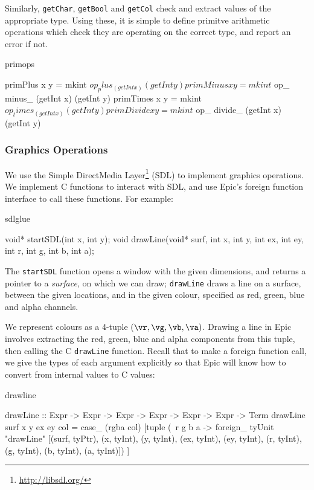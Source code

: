 \noindent
Similarly, \texttt{getChar}, \texttt{getBool} and \texttt{getCol}
check and extract values of the appropriate type.
Using these, it is simple to define primitve arithmetic operations
which check they are operating on the correct type, and report an
error if not.

\begin{SaveVerbatim}{primops}

primPlus   x y = mkint $ op_ plus_   (getInt x) (getInt y)
primMinus  x y = mkint $ op_ minus_  (getInt x) (getInt y)
primTimes  x y = mkint $ op_ times_  (getInt x) (getInt y)
primDivide x y = mkint $ op_ divide_ (getInt x) (getInt y)

\end{SaveVerbatim}

\subsubsection{Graphics Operations}

We use the Simple DirectMedia Layer\footnote{\url{http://libsdl.org/}}
(SDL) to implement graphics operations. We implement C functions to
interact with SDL, and use Epic's foreign function interface to
call these functions. For example:

\begin{SaveVerbatim}{sdlglue}

void* startSDL(int x, int y);
void  drawLine(void* surf,
               int x, int y, int ex, int ey,
               int r, int g, int b, int a);

\end{SaveVerbatim}

\noindent
The \texttt{startSDL} function opens a window with the given
dimensions, and returns a pointer to a \emph{surface}, on which we can
draw; \texttt{drawLine} draws a line on a surface, between the given
locations, and in the given colour, specified as red, green, blue and
alpha channels.

We represent colours as a 4-tuple $(\vr,\vg,\vb,\va)$.  Drawing a line
in Epic involves extracting the red, green, blue and alpha components
from this tuple, then calling the C \texttt{drawLine} function. Recall
that to make a foreign function call, we give the types of each
argument explicitly so that Epic will know how to convert from
internal values to C values:

\begin{SaveVerbatim}{drawline}

drawLine :: Expr -> Expr -> Expr -> 
            Expr -> Expr -> Expr -> Term
drawLine surf x y ex ey col
    = case_ (rgba col)
        [tuple (\ r g b a ->
           foreign_ tyUnit "drawLine" 
             [(surf, tyPtr),
              (x, tyInt), (y, tyInt), (ex, tyInt), (ey, tyInt),
              (r, tyInt), (g, tyInt), (b, tyInt), (a, tyInt)]) ]

\end{SaveVerbatim}

